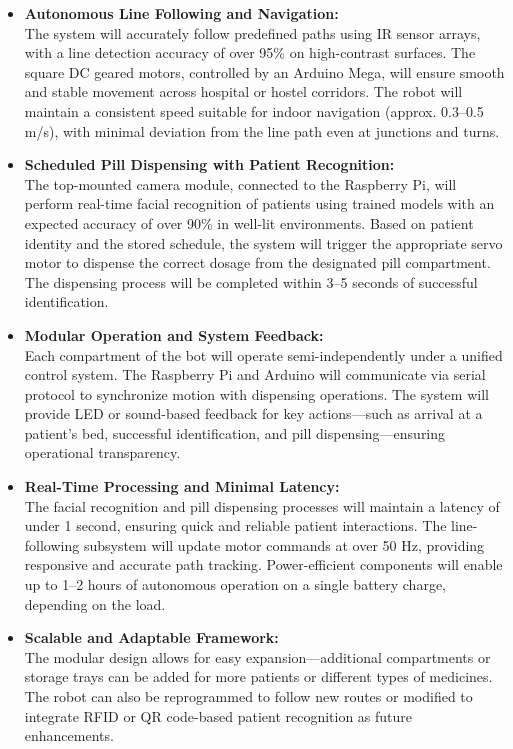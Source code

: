 \begin{itemize}
    \item \textbf{Autonomous Line Following and Navigation:} \\
    The system will accurately follow predefined paths using IR sensor arrays, with a line detection accuracy of over 95\% on high-contrast surfaces. The square DC geared motors, controlled by an Arduino Mega, will ensure smooth and stable movement across hospital or hostel corridors. The robot will maintain a consistent speed suitable for indoor navigation (approx. 0.3–0.5 m/s), with minimal deviation from the line path even at junctions and turns.

    \item \textbf{Scheduled Pill Dispensing with Patient Recognition:} \\
    The top-mounted camera module, connected to the Raspberry Pi, will perform real-time facial recognition of patients using trained models with an expected accuracy of over 90\% in well-lit environments. Based on patient identity and the stored schedule, the system will trigger the appropriate servo motor to dispense the correct dosage from the designated pill compartment. The dispensing process will be completed within 3–5 seconds of successful identification.

    \item \textbf{Modular Operation and System Feedback:} \\
    Each compartment of the bot will operate semi-independently under a unified control system. The Raspberry Pi and Arduino will communicate via serial protocol to synchronize motion with dispensing operations. The system will provide LED or sound-based feedback for key actions—such as arrival at a patient’s bed, successful identification, and pill dispensing—ensuring operational transparency.

    \item \textbf{Real-Time Processing and Minimal Latency:} \\
    The facial recognition and pill dispensing processes will maintain a latency of under 1 second, ensuring quick and reliable patient interactions. The line-following subsystem will update motor commands at over 50 Hz, providing responsive and accurate path tracking. Power-efficient components will enable up to 1–2 hours of autonomous operation on a single battery charge, depending on the load.

    \item \textbf{Scalable and Adaptable Framework:} \\
    The modular design allows for easy expansion—additional compartments or storage trays can be added for more patients or different types of medicines. The robot can also be reprogrammed to follow new routes or modified to integrate RFID or QR code-based patient recognition as future enhancements.
\end{itemize}

